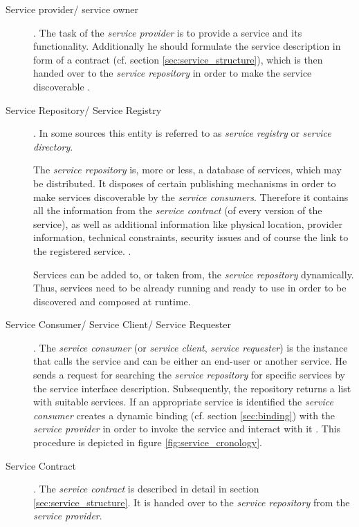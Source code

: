\begin{description}
\item [Service provider/ service owner]. 
The task of the \emph{service provider} is to provide a service and its functionality. Additionally he should formulate the service description in form of a contract (cf. section \ref{sec:service_structure}), which is then handed over to the \emph{service repository} in order to make the service discoverable \cite{breivold}.

\item [Service Repository/ Service Registry].
In some sources this entity is referred to as \emph{service registry} or \emph{service directory}.

The \emph{service repository} is, more or less, a database of services, which may be distributed. It disposes of certain publishing mechanisms in order to make services discoverable by the \emph{service consumers}. Therefore it contains all the information from the \emph{service contract} (of every version of the service), as well as additional information like physical location, provider information, technical constraints, security issues and of course the link to the registered service. \cite[p.60-61]{krafzig} \cite{breivold} \cite{converge}.

Services can be added to, or taken from, the \emph{service repository} dynamically. Thus, services need to be already running and ready to use in order to be discovered and composed at runtime.

\item [Service Consumer/ Service Client/ Service Requester] .
The \emph{service consumer} (or \emph{service client}, \emph{service requester}) is the instance that calls the service and can be either an end-user or another service. He sends a request for searching the \emph{service repository} for specific services by the service interface description. Subsequently, the repository returns a list with suitable services. If an appropriate service is identified the \emph{service consumer} creates a dynamic binding (cf. section \ref{sec:binding}) with the \emph{service provider} in order to invoke the service and interact with it \cite{breivold} \cite{converge}. This procedure is depicted in figure \ref{fig:service_cronology}.

\item [Service Contract] .
The \emph{service contract} is described in detail in section \ref{sec:service_structure}. It is handed over to the \emph{service repository} from the \emph{service provider}.


\end{description}

